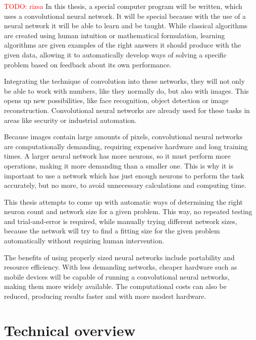 \documentclass[12pt]{report}
\newcommand\todo[1]{\textcolor{red}{#1}}
\begin{document}
\todo{TODO: rizsa} In this thesis, a special computer program will be written, which uses a convolutional neural network. It will be special because with the use of a neural network it will be able to learn and be taught. While classical algorithms are created using human intuition or mathematical formulation, learning algorithms are given examples of the right answers it should produce with the given data, allowing it to automatically develop ways of solving a specific problem based on feedback about its own performance.\par
Integrating the technique of convolution into these networks, they will not only be able to work with numbers, like they normally do, but also with images. This opens up new possibilities, like face recognition, object detection or image reconstruction. Convolutional neural networks are already used for these tasks in areas like security or industrial automation.\par
Because images contain large amounts of pixels, convolutional neural networks are computationally demanding, requiring expensive hardware and long training times. A larger neural network has more neurons, so it must perform more operations, making it more demanding than a smaller one. This is why it is important to use a network which has just enough neurons to perform the task accurately, but no more, to avoid unnecessary calculations and computing time.\par
This thesis attempts to come up with automatic ways of determining the right neuron count and network size for a given problem. This way, no repeated testing and trial-and-error is required, while manually trying different network sizes, because the network will try to find a fitting size for the given problem automatically without requiring human intervention.\par
The benefits of using properly sized neural networks include portability and resource efficiency. With less demanding networks, cheaper hardware such as mobile devices will be capable of running a convolutional neural networks, making them more widely available. The computational costs can also be reduced, producing results faster and with more modest hardware.
\chapter{Technical overview}
\end{document}
